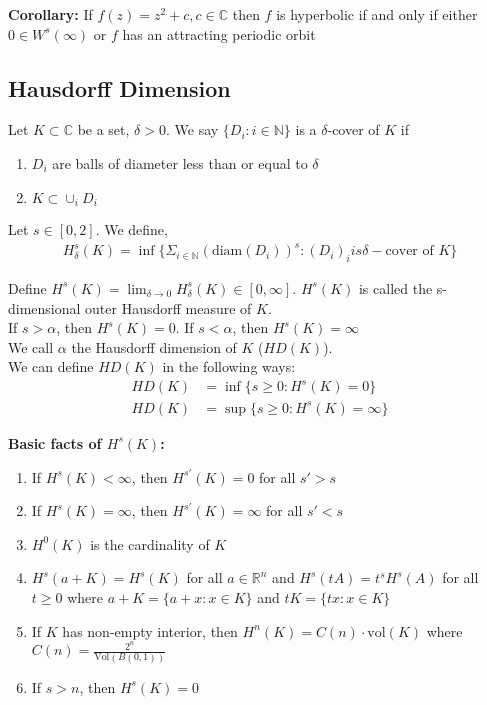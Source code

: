 \documentclass[12pt]{article}
\begin{document}
\textbf{Corollary:} If $f(z) = z^2 + c, c \in \mathbb{C}$ then $f$ is hyperbolic if and only if either $0 \in W^s(\infty)$ or $f$ has an attracting periodic orbit

\subsection{Hausdorff Dimension}

Let $K \subset \mathbb{C}$ be a set, $\delta > 0$. We say $\{D_i: i \in \mathbb{N}\}$ is a $\delta$-cover of $K$ if
\begin{enumerate}
\item $D_i$ are balls of diameter less than or equal to $\delta$

\item $K \subset \cup_i D_i$
\end{enumerate}

Let $s \in [0, 2]$. We define,
\begin{align*}
H^s_{\delta}(K) = \inf \{\Sigma_{i \in \mathbb{N}}(\text{diam}(D_i))^s : (D_i)_i is \delta-\text{cover of } K\}
\end{align*}

Define $H^s(K) = \lim_{\delta \to 0} H^s_{\delta}(K) \in [0, \infty]$. $H^s(K)$ is called the s-dimensional outer Hausdorff measure of $K$.\\

If $s > \alpha$, then $H^s(K) = 0$. If $s < \alpha$, then $H^s(K) = \infty$\\

We call $\alpha$ the Hausdorff dimension of $K$ ($HD(K)$).\\

We can define $HD(K)$ in the following ways:
\begin{align*}
HD(K) &= \inf \{s \geq 0 : H^s(K) = 0\}\\
HD(K) &= \sup \{s \geq 0 : H^s(K) = \infty \}
\end{align*}

\textbf{Basic facts of $H^s(K)$:}
\begin{enumerate}

\item If $H^s(K) < \infty$, then $H^{s'}(K) = 0$ for all $s' > s$

\item If $H^s(K) = \infty$, then $H^{s'}(K) = \infty$ for all $s' < s$

\item $H^0(K)$ is the cardinality of $K$

\item $H^s(a+K) = H^s(K)$ for all $a \in \mathbb{R}^n$ and $H^s(tA) = t^s H^s(A)$ for all $t \geq 0$ where $a + K = \{a + x: x \in K\}$ and $tK = \{tx: x \in K\}$

\item If $K$ has non-empty interior, then $H^n(K) = C(n) \cdot \text{vol}(K)$ where $C(n) = \frac{2^n}{\text{Vol}(B(0,1))}$

\item If $s > n$, then $H^s(K) = 0$
\end{enumerate}
\end{document}
